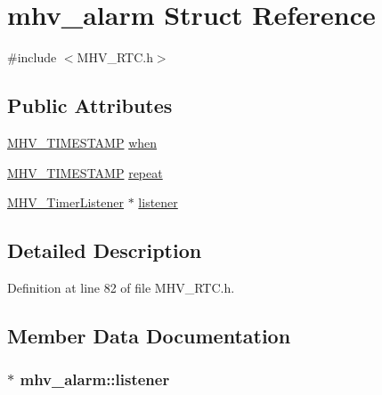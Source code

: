 \hypertarget{structmhv__alarm}{
\section{mhv\-\_\-alarm \-Struct \-Reference}
\label{structmhv__alarm}
}


{\ttfamily \#include $<$\-M\-H\-V\-\_\-\-R\-T\-C.\-h$>$}

\subsection*{\-Public \-Attributes}
\begin{DoxyCompactItemize}
\item 
\hyperlink{_m_h_v___r_t_c_8h_a1e30d3a92b1b868286bd0d619245d8a6}{\-M\-H\-V\-\_\-\-T\-I\-M\-E\-S\-T\-A\-M\-P} \hyperlink{structmhv__alarm_acbab8b3b4efa4d891d598cbd5b47fb7c}{when}
\item 
\hyperlink{_m_h_v___r_t_c_8h_a1e30d3a92b1b868286bd0d619245d8a6}{\-M\-H\-V\-\_\-\-T\-I\-M\-E\-S\-T\-A\-M\-P} \hyperlink{structmhv__alarm_ad8195c11cd5d6ff3bb37d01185c04af2}{repeat}
\item 
\hyperlink{class_m_h_v___timer_listener}{\-M\-H\-V\-\_\-\-Timer\-Listener} $\ast$ \hyperlink{structmhv__alarm_a8293d729772996c869be76184bfc09e8}{listener}
\end{DoxyCompactItemize}


\subsection{\-Detailed \-Description}


\-Definition at line 82 of file \-M\-H\-V\-\_\-\-R\-T\-C.\-h.



\subsection{\-Member \-Data \-Documentation}
\hypertarget{structmhv__alarm_a8293d729772996c869be76184bfc09e8}{
\subsubsection[{listener}]{$\ast$ {\bf mhv\-\_\-alarm\-::listener}}}
\label{structmhv__alarm_a8293d729772996c869be76184bfc09e8}


